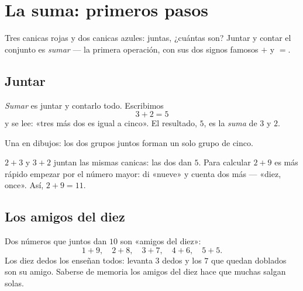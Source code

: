 \chapter{La suma: primeros pasos}\label{ch:g1:addition}

Tres canicas rojas y dos canicas azules: juntas, ¿cuántas son? Juntar
y contar el conjunto es \emph{sumar} --- la primera
operación, con sus dos signos famosos $+$ y $=$.

\section{Juntar}

\begin{definition}[La suma]\label{def:g1:addition:def}
\emph{Sumar} es juntar y contarlo todo. Escribimos
\[
3 + 2 = 5
\]
y se lee: «tres más dos es igual a cinco». El resultado, $5$, es la
\emph{suma} de $3$ y $2$.
\end{definition}

\begin{omfigure}

{\small Una  en dibujos: los dos grupos juntos forman un solo
grupo de cinco.}
\end{omfigure}

\begin{example}\label{ex:g1:addition:order}
$2 + 3$ y $3 + 2$ juntan las mismas canicas: las dos dan $5$.
Para calcular $2 + 9$ es más rápido empezar por el número mayor:
di «nueve» y cuenta dos más --- «diez, once». Así,
$2 + 9 = 11$.
\end{example}

\section{Los amigos del diez}

\begin{example}[Complementos a 10]\label{ex:g1:addition:friends}
Dos números que juntos dan $10$ son «amigos del diez»:
\[
1 + 9, \quad 2 + 8, \quad 3 + 7, \quad 4 + 6, \quad 5 + 5 .
\]
Los diez dedos los enseñan todos: levanta $3$ dedos y los $7$ que quedan
doblados son su amigo. Saberse de memoria los amigos del diez hace que
muchas  salgan solas.
\end{example}

